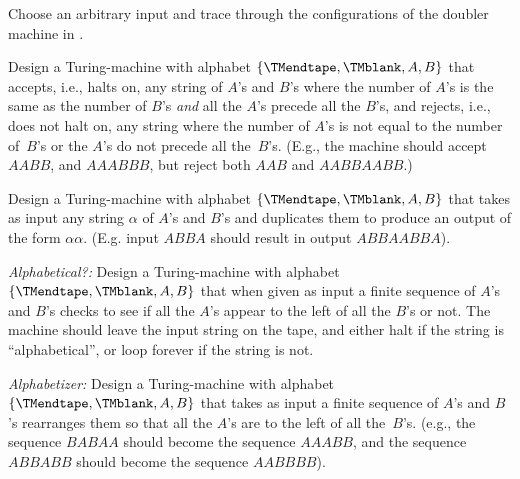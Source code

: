 \documentclass[../../../include/open-logic-section]{subfiles}
\begin{document}
\begin{prob}
Choose an arbitrary input and trace through the configurations of the
doubler machine in .
\end{prob}

\begin{prob}
Design a Turing-machine with alphabet $\{\TMendtape,\TMblank, A, B\}$
that accepts, i.e., halts on, any string of $A$'s and $B$'s where the
number of $A$'s is the same as the number of $B$'s \emph{and} all the
$A$'s precede all the $B$'s, and rejects, i.e., does not halt on, any
string where the number of $A$'s is not equal to the number of~$B$'s or
the $A$'s do not precede all the~$B$'s. (E.g., the machine should accept
$AABB$, and $AAABBB$, but reject both $AAB$ and $AABBAABB$.)
\end{prob}

\begin{prob}
Design a Turing-machine with alphabet $\{\TMendtape,\TMblank, A, B\}$
that takes as input any string $\alpha$ of $A$'s and $B$'s and
duplicates them to produce an output of the form $\alpha\alpha$. (E.g.
input $ABBA$ should result in output $ABBAABBA$).
\end{prob}

\begin{prob}
\emph{Alphabetical?:} Design a Turing-machine with alphabet
$\{\TMendtape,\TMblank, A, B\}$ that when given as input a finite
sequence of $A$'s and $B$'s checks to see if all the $A$'s appear to
the left of all the $B$'s or not. The machine should leave the input
string on the tape, and either halt if the string is
``alphabetical'', or loop forever if the string is not.
\end{prob}

\begin{prob}
\emph{Alphabetizer:} Design a Turing-machine with alphabet
$\{\TMendtape,\TMblank, A, B\}$ that takes as input a finite sequence
of $A$'s and $B$'s rearranges them so that all the $A$'s are to the
left of all the~$B$'s. (e.g., the sequence $BABAA$ should become the
sequence $AAABB$, and the sequence $ABBABB$ should become the sequence
$AABBBB$).
\end{prob}
\end{document}
